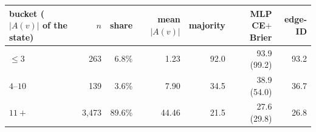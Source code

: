 {\setlength{\tabcolsep}{4.5pt}\begin{tabular}{lrrrrrr}\toprule
bucket ($|A(v)|$ of the state) & $n$ & share & mean $|A(v)|$ & majority & MLP CE$+$Brier & edge-ID \\\midrule
$\leq 3$ & 263 & 6.8\% & 1.23 & 92.0 & 93.9 (99.2) & 93.2 \\
$4$--$10$ & 139 & 3.6\% & 7.90 & 34.5 & 38.9 (54.0) & 36.7 \\
$11+$ & 3{,}473 & 89.6\% & 44.46 & 21.5 & 27.6 (29.8) & 26.8 \\
\bottomrule\end{tabular}}
